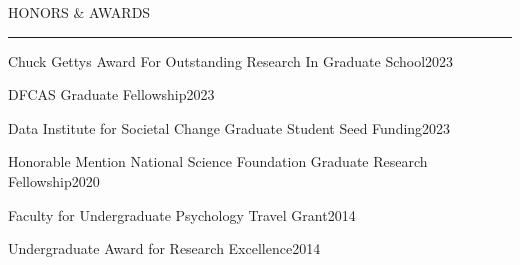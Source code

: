 \documentclass{resume} %
\renewenvironment{rSection}[1]{
	\sectionskip
	\textcolor{CarnegieMellonRed}{\MakeUppercase{#1}}
	\sectionlineskip
	\hrule
	\begin{list}{}{
			\setlength{\leftmargin}{1.5em}
		}
		\item[]
	}{
	\end{list}
}
\begin{document}
	\begin{rSection}{Honors \& Awards}
		\begin{rSubsectionAward}{Chuck Gettys Award For Outstanding Research In Graduate School}{2023}\end{rSubsectionAward}
		\begin{rSubsectionAward}{DFCAS Graduate Fellowship}{2023}\end{rSubsectionAward}
		\begin{rSubsectionAward}{Data Institute for Societal Change Graduate Student Seed Funding}{2023}\end{rSubsectionAward}
		\begin{rSubsectionAward}{Honorable Mention National Science Foundation Graduate Research Fellowship}{2020}\end{rSubsectionAward}
		\begin{rSubsectionAward}{Faculty for Undergraduate Psychology Travel Grant}{2014}\end{rSubsectionAward}
		\begin{rSubsectionAward}{Undergraduate Award for Research Excellence}{2014}\end{rSubsectionAward}
	\end{rSection}
	
\end{document}
